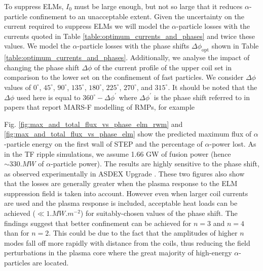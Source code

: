 \documentclass[10pt, a4paper, twoside]{article}
\begin{document}
To suppress ELMs, $I_0$ must be large enough, but not so large that it reduces $\alpha$-particle confinement to an unacceptable extent. Given the uncertainty on the current required to suppress ELMs we will model the $\alpha$-particle losses with the currents quoted in Table \ref{table:optimum_currents_and_phases} and twice these values.
We model the $\alpha$-particle losses with the phase shifts $\Delta\phi_\text{opt}$ shown in Table \ref{table:optimum_currents_and_phases}. Additionally, we analyse the impact of changing the phase shift $\Delta\phi$ of the current profile of the upper coil set in comparison to the lower set on the confinement of fast particles. We consider $\Delta\phi$ values of $0^\circ$, $45^\circ$, $90^\circ$, $135^\circ$, $180^\circ$, $225^\circ$, $270^\circ$, and $315^\circ$. It should be noted that the $\Delta\phi$ used here is equal to $360^{\circ}-\Delta\phi^{\prime}$ where $\Delta\phi^{\prime}$ is the phase shift referred to in papers that report MARS-F modelling of RMPs, for example \cite{ryan2017}   

Fig. \ref{fig:max_and_total_flux_vs_phase_elm_rwm} and \ref{fig:max_and_total_flux_vs_phase_elm} show the predicted maximum flux of $\alpha$-particle energy on the first wall of STEP and the percentage of $\alpha$-power lost. As in the TF ripple simulations, we assume 1.66 GW of fusion power (hence $\sim\si{330.MW}$ of $\alpha$-particle power). The results are highly sensitive to the phase shift, as observed experimentally in ASDEX Upgrade \cite{sanchis2018}. These two figures also show that the losses are generally greater when the plasma response to the ELM suppression field is taken into account. However even when larger coil currents are used and the plasma response is included, acceptable heat loads can be achieved ($\ll \si{1.MW.m^{-2}}$) for suitably-chosen values of the phase shift. The findings suggest that better confinement can be achieved for $n=3$ and $n=4$ than for $n=2$. This could be due to the fact that the amplitudes of higher $n$ modes fall off more rapidly with distance from the coils, thus reducing the field perturbations in the plasma core where the great majority of high-energy $\alpha$-particles are located.
\end{document}
